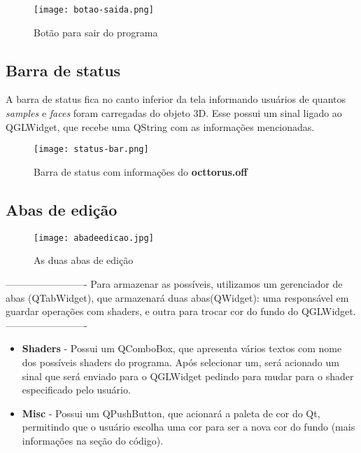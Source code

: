 \begin{figure}[H]
    \centering
    \texttt{[image: botao-saida.png]}
    \caption{Botão para sair do programa}
\end{figure}

\subsection{Barra de status}

A barra de status fica no canto inferior da tela 
informando usuários de quantos \emph{samples} e \emph{faces} foram carregadas 
do objeto 3D.
Esse possui um sinal ligado ao QGLWidget, que recebe 
uma QString com as informações mencionadas.

\begin{figure}[H]
    \centering
    \texttt{[image: status-bar.png]}
    \caption{Barra de status com informações do \textbf{octtorus.off}}
\end{figure}

\newpage

\subsection{Abas de edição}

\begin{figure}[H]
    \centering
    \texttt{[image: abadeedicao.jpg]}
    \caption{As duas abas de edição}
\end{figure}

-------------------------
Para armazenar as possíveis, utilizamos um gerenciador 
de abas (QTabWidget), que armazenará duas abas(QWidget): uma 
responsável em guardar operações com shaders, e outra 
para trocar cor do fundo do QGLWidget.
-------------------------

\begin{itemize}
    \item \textbf{Shaders} - Possui um QComboBox, que apresenta 
    vários textos com nome dos possíveis shaders do 
    programa. Após selecionar um, será acionado um sinal 
    que será enviado para o QGLWidget pedindo para mudar 
    para o shader especificado pelo usuário.
    \item \textbf{Misc} - Possui um QPushButton, que acionará a 
    paleta de cor do Qt, permitindo que o usuário escolha 
    uma cor para ser a nova cor do fundo (mais informações 
    na seção do código).
\end{itemize}